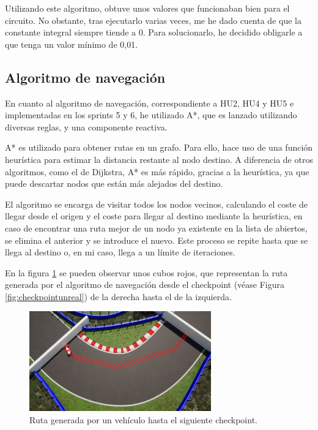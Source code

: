 \bigskip

Utilizando este algoritmo, obtuve unos valores que funcionaban bien para el circuito. No obstante, tras ejecutarlo varias veces, me he dado cuenta de que la constante integral siempre tiende a 0. Para solucionarlo, he decidido obligarle a que tenga un valor mínimo de 0,01.

\newpage

\subsection{Algoritmo de navegación}

En cuanto al algoritmo de navegación, correspondiente a HU2, HU4 y HU5 e implementadas en los sprints 5 y 6, he utilizado A*\cite{4082128}, que es lanzado utilizando diversas reglas, y una componente reactiva. 

\bigskip

A* es utilizado para obtener rutas en un grafo. Para ello, hace uso de una función heurística para estimar la distancia restante al nodo destino. A diferencia de otros algoritmos, como el de Dijkstra, A* es más rápido, gracias a la heurística, ya que puede descartar nodos que están más alejados del destino.

\bigskip

El algoritmo se encarga de visitar todos los nodos vecinos, calculando el coste de llegar desde el origen y el coste para llegar al destino mediante la heurística, en caso de encontrar una ruta mejor de un nodo ya existente en la lista de abiertos, se elimina el anterior y se introduce el nuevo. Este proceso se repite hasta que se llega al destino o, en mi caso, llega a un límite de iteraciones.

\bigskip

En la figura \ref{fig:rutaastar} se pueden observar unos cubos rojos, que representan la ruta generada por el algoritmo de navegación desde el checkpoint (véase Figura \ref{fig:checkpointunreal}) de la derecha hasta el de la izquierda.

\begin{figure}[H]
    \centering
    \includegraphics[width=0.7\textwidth]{imagenes/converted/rutaAStar.jpg}
    \caption{Ruta generada por un vehículo hasta el siguiente checkpoint.}
    \label{fig:rutaastar}
\end{figure}


